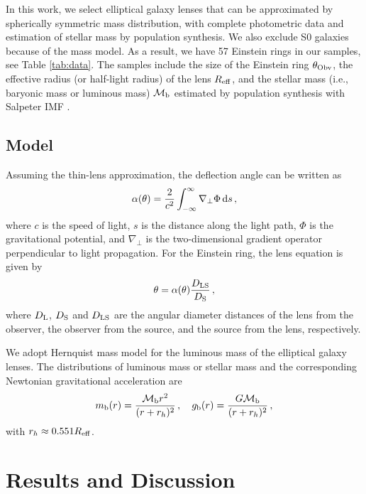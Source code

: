 \documentclass[fleqn,usenatbib,useAMS]{mnras}
\begin{document}
    In this work, we select elliptical galaxy lenses that can be approximated by spherically symmetric mass distribution, with complete photometric data and estimation of stellar mass by population synthesis.
    We also exclude S0 galaxies because of the mass model.
    As a result, we have 57 Einstein rings in our samples, see Table \ref{tab:data}.
    The samples include the size of the Einstein ring $\theta_{\rm Obv}$, the effective radius (or half-light radius) of the lens $R_{\rm eff}$, and the stellar mass (i.e., baryonic mass or luminous mass) ${\cal M}_{\rm b}$ estimated by population synthesis with Salpeter IMF \citep{Auger09}.

        \subsection{Model}

    Assuming the thin-lens approximation, the deflection angle can be written as
    \begin{equation}\label{deflection}
       \alpha(\theta)=\frac{2}{c^2}\int^{\infty}_{-\infty} \nabla_{\bot}\Phi\,{\rm d}s\,,
    \end{equation}
    where $c$ is the speed of light, $s$ is the distance along the light path, $\Phi$ is the gravitational potential, and $\nabla_{\bot}$ is the two-dimensional gradient operator perpendicular to light propagation.
    For the Einstein ring, the lens equation is given by
    \begin{equation}\label{lensEq}
        \theta=\alpha(\theta)\frac{D_{\rm LS}}{D_{\rm S}}\,,
    \end{equation}
    where $D_{\rm L}$, $D_{\rm S}$ and $D_{\rm LS}$ are the angular diameter distances of the lens from the observer, the observer from the source, and the source from the lens, respectively.

    We adopt Hernquist mass model \citep{Hernquist90} for the luminous mass of the elliptical galaxy lenses.
    The distributions of luminous mass or stellar mass and the corresponding Newtonian gravitational acceleration are
    \begin{equation}\label{eq:Hernquist}
      m_{\rm b}(r)=\frac{{\cal M}_{\rm b}r^2}{(r+r_h)^2}\,,
      \quad g_{\rm b}(r)=\frac{G{\cal M}_{\rm b}}{(r+r_h)^2}\,,
    \end{equation}
    with $r_h\approx 0.551 R_{\rm eff}$.

    \section{Results and Discussion}
\end{document}
